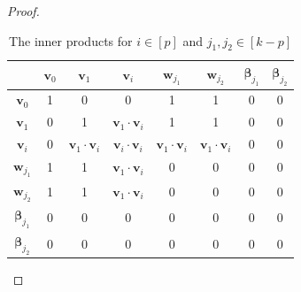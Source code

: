 \documentclass[
final
]{dmtcs-episciences}
\begin{document}
\begin{proof}
\begin{table}
    \centering
    \begin{tabular}{|c|c|c|c|c|c|c|c|}
    \hline
         & $\textbf{v}_0$ & $\textbf{v}_1$  & $\textbf{v}_i$ & $\textbf{w}_{j_1}$ & $\textbf{w}_{j_2}$ & $\boldsymbol{\beta}_{j_1}$ &  $\boldsymbol{\beta}_{j_2}$\\
    \hline
        $\textbf{v}_0$ & 1 & 0 & 0 & 1 & 1 & 0 & 0\\
    \hline
        $\textbf{v}_1$ & 0 & 1 & $\textbf{v}_1\cdot \textbf{v}_i$ & 1 & 1 & 0 & 0\\
    \hline
        $\textbf{v}_i$ & 0 & $\textbf{v}_1\cdot \textbf{v}_i$ & $\textbf{v}_i\cdot \textbf{v}_i$ & $\textbf{v}_1\cdot \textbf{v}_i$ & $\textbf{v}_1\cdot \textbf{v}_i$ & 0 & 0\\
    \hline
        $\textbf{w}_{j_1}$ & 1 & 1 & $\textbf{v}_1\cdot \textbf{v}_i$ & 0 & 0 & 0 & 0\\
    \hline
        $\textbf{w}_{j_2}$ & 1 & 1 & $\textbf{v}_1\cdot \textbf{v}_i$ & 0 & 0 & 0 & 0\\
    \hline
        $\boldsymbol{\beta}_{j_1}$ & 0 & 0 & 0 & 0 & 0 & 0 & 0\\
    \hline
        $\boldsymbol{\beta}_{j_2}$ & 0 & 0 & 0 & 0 & 0 & 0 & 0\\
    \hline
    \end{tabular}
    \caption{The inner products for $i\in[p]$ and $j_1,j_2\in[k-p]$}\label{tab}
\end{table}


\end{proof}
\end{document}
